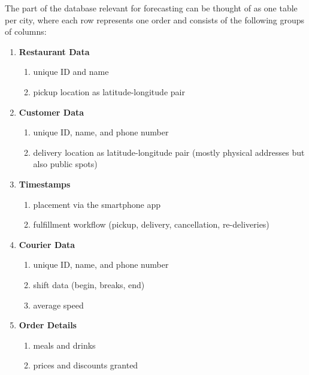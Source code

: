 The part of the database relevant for forecasting can be thought of as one
    table per city, where each row represents one order and consists of the
    following groups of columns:
\begin{enumerate}
\item \textbf{Restaurant Data}
    \begin{enumerate}
    \item unique ID and name
    \item pickup location as latitude-longitude pair
    \end{enumerate}
\item \textbf{Customer Data}
    \begin{enumerate}
    \item unique ID, name, and phone number
    \item delivery location as latitude-longitude pair (mostly physical
	      addresses but also public spots)
	\end{enumerate}
\item \textbf{Timestamps}
    \begin{enumerate}
    \item placement via the smartphone app
    \item fulfillment workflow (pickup, delivery, cancellation, re-deliveries)
    \end{enumerate}
\item \textbf{Courier Data}
    \begin{enumerate}
    \item unique ID, name, and phone number
    \item shift data (begin, breaks, end)
    \item average speed
    \end{enumerate}
\item \textbf{Order Details}
    \begin{enumerate}
    \item meals and drinks
    \item prices and discounts granted
    \end{enumerate}
\end{enumerate}
